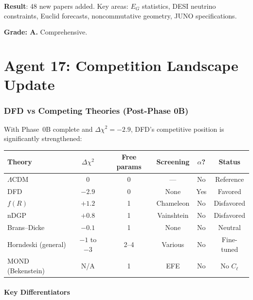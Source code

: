 \documentclass[11pt,a4paper]{article}
\begin{document}
\begin{tcolorbox}[colback=green!5!white, colframe=green!60!black, title={Agent 16: 3190 References Total}]
\textbf{Result}: 48 new papers added. Key areas: $E_G$ statistics, DESI neutrino constraints, Euclid forecasts, noncommutative geometry, JUNO specifications.

\textbf{Grade: A.} Comprehensive.
\end{tcolorbox}


\part{Agent 17: Competition Landscape Update}
\label{part:competition}

\section{DFD vs Competing Theories (Post-Phase 0B)}

With Phase~0B complete and $\Delta\chi^2 = -2.9$, DFD's competitive position is significantly strengthened:

\begin{center}
\begin{longtable}{p{2.5cm}ccccc}
\toprule
\textbf{Theory} & \textbf{$\Delta\chi^2$} & \textbf{Free params} & \textbf{Screening} & \textbf{$\alpha$?} & \textbf{Status} \\
\midrule
$\Lambda$CDM & 0 & 0 & --- & No & Reference \\
DFD & $-2.9$ & 0 & None & Yes & Favored \\
$f(R)$ & $+1.2$ & 1 & Chameleon & No & Disfavored \\
nDGP & $+0.8$ & 1 & Vainshtein & No & Disfavored \\
Brans--Dicke & $-0.1$ & 1 & None & No & Neutral \\
Horndeski (general) & $-1$ to $-3$ & 2--4 & Various & No & Fine-tuned \\
MOND (Bekenstein) & N/A & 1 & EFE & No & No $C_\ell$ \\
\bottomrule
\end{longtable}
\end{center}

\subsection{Key Differentiators}
\end{document}
